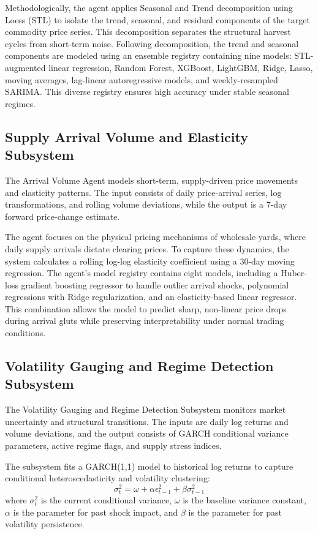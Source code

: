 \documentclass[12pt,a4paper]{report}
\theoremstyle{definition}
\theoremstyle{remark}
\begin{document}
Methodologically, the agent applies Seasonal and Trend decomposition using Loess (STL) to isolate the trend, seasonal, and residual components of the target commodity price series. This decomposition separates the structural harvest cycles from short-term noise. Following decomposition, the trend and seasonal components are modeled using an ensemble registry containing nine models: STL-augmented linear regression, Random Forest, XGBoost, LightGBM, Ridge, Lasso, moving averages, lag-linear autoregressive models, and weekly-resampled SARIMA. This diverse registry ensures high accuracy under stable seasonal regimes.

\subsection{Supply Arrival Volume and Elasticity Subsystem}

The Arrival Volume Agent models short-term, supply-driven price movements and elasticity patterns. The input consists of daily price-arrival series, log transformations, and rolling volume deviations, while the output is a 7-day forward price-change estimate.

The agent focuses on the physical pricing mechanisms of wholesale yards, where daily supply arrivals dictate clearing prices. To capture these dynamics, the system calculates a rolling log-log elasticity coefficient using a 30-day moving regression. The agent's model registry contains eight models, including a Huber-loss gradient boosting regressor to handle outlier arrival shocks, polynomial regressions with Ridge regularization, and an elasticity-based linear regressor. This combination allows the model to predict sharp, non-linear price drops during arrival gluts while preserving interpretability under normal trading conditions.

\subsection{Volatility Gauging and Regime Detection Subsystem}

The Volatility Gauging and Regime Detection Subsystem monitors market uncertainty and structural transitions. The inputs are daily log returns and volume deviations, and the output consists of GARCH conditional variance parameters, active regime flags, and supply stress indices.

The subsystem fits a GARCH(1,1) model to historical log returns to capture conditional heteroscedasticity and volatility clustering:
\begin{equation}
    \sigma_t^2 = \omega + \alpha \epsilon_{t-1}^2 + \beta \sigma_{t-1}^2
\end{equation}
where $\sigma_t^2$ is the current conditional variance, $\omega$ is the baseline variance constant, $\alpha$ is the parameter for past shock impact, and $\beta$ is the parameter for past volatility persistence.
\end{document}
